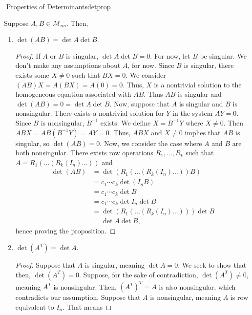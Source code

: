        \begin{theorem}{\Stop\,\,Properties of Determinants}{detprop}

            Suppose \(A,B\in\mathcal{M}_{nn}\). Then,
            \begin{enumerate}
                \item \(\det (AB) = \det A\det B\).
                \begin{proof}
                    If \(A\) or \(B\) is singular, \(\det A\det B=0\). For now, let \(B\) be singular. We don't make any assumptions about \(A\), for now. Since \(B\) is singular, there exists some \(X\neq0\) such that \(BX=0\). We consider \((AB)X=A(BX)=A(0)=0\). Thus, \(X\) is a nontrivial solution to the homogeneous equation associated with \(AB\). Thus \(AB\) is singular and \(\det (AB) = 0 = \det A\det B\). Now, suppose that \(A\) is singular and \(B\) is nonsingular. There exists a nontrivial solution for \(Y\) in the system \(AY=0\). Since \(B\) is nonsingular, \(B^{-1}\) exists. We define \(X=B^{-1}Y\) where \(X\neq0\). Then \(ABX=AB(B^{-1}Y)=AY=0\). Thus, \(ABX\) and \(X\neq 0\) implies that \(AB\) is singular, so \(\det (AB)=0\). Now, we consider the case where \(A\) and \(B\) are both nonsingular. There exists row operations \(R_1,\ldots,R_k\) such that \(A=R_1(\ldots(R_k(I_n)\ldots))\) and 
                    \begin{align*}
                        \det (AB)&=\det(R_1(\ldots(R_k(I_n)\ldots))B) \\
                        &=c_1\cdots c_k\det (I_nB) \\
                        &=c_1\cdots c_k\det B \\
                        &=c_1\cdots c_k \det I_n\det B \\
                        &=\det(R_1(\ldots(R_k(I_n)\ldots)))\det B \\
                        &=\det A\det B,
                    \end{align*}
                    hence proving the proposition.
                \end{proof}
                \item \(\det (A^T) = \det A\).
                \begin{proof}
                    Suppose that \(A\) is singular, meaning \(\det A=0\). We seek to show that then, \(\det (A^T)=0\). Suppose, for the sake of contradiction, \(\det (A^T)\neq0\), meaning \(A^T\) is nonsingular. Then, \((A^T)^T=A\) is also nonsingular, which contradicts our assumption. Suppose that \(A\) is nonsingular, meaning \(A\) is row equivalent to \(I_n\). That means

\end{proof}
\end{enumerate}
\end{theorem}
